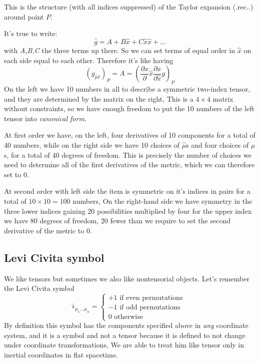 This is the structure (with all indices suppressed) of the Taylor expansion (.rec..) around point $P$. \par
It's true to write:
\[
	\hat{g} = A+ B \hat{x} + C \hat{x}\hat{x} + \ldots 
\]
with \emph{A,B,C} the three terms up there. So we can set terms of equal order in $\hat{x}$ on each side equal to each other. Therefore it's like having
\[
	\left( g_{\hat{\mu }\hat{\nu }} \right)_{P} = A = \left( \frac{\partial x}{\partial } \hat{x} \frac{\partial x}{\partial \hat{x}} g  \right)_{P}
\]
On the left we have 10 numbers in all to describe a symmetric two-index tensor, and they are determined by the matrix on the right, This is a $4\times 4$ matrix without constraints, so we have enough freedom to put the 10 numbers of the left tensor into \emph{canonical form}.\par
At first order we have, on the left, four derivatives of 10 components for a total of 40 numbers, while on the right side we have 10 choices of $\hat{\mu }$s and four choices of $\mu$s, for a total of 40 degrees of freedom. This is precisely the number of choices we need to determine all of the first derivatives of the metric, which we can therefore set to 0. \par
At second order with left side the item is symmetric on it's indices in pairs for a total of $10 \times 10 = 100$ numbers, On the right-hand side we have symmetry in the three lower indices gaining 20 possibilities multiplied by four for the upper index we have 80 degrees of freedom, 20 fewer than we require to set the second derivative of the metric to 0.\par

\subsection{Levi Civita symbol}
We like tensors but sometimes we also like nontensorial objects.
Let's remember the Levi Civita symbol 
\[
	\tilde{\epsilon}_{\mu _{1}\ldots \mu _{n }} = \begin{cases}
	+1 \text{ if even permutations } \\
	-1 \text{ if odd permutations } \\
	0 \text{ otherwise }
	\end{cases}
	
\]
By definition this symbol has the components specified above in \emph{any} coordinate system, and it is a symbol and not a tensor because it is defined to not change under coordinate transformations, We are able to treat him like tensor only in inertial coordinates in flat spacetime.




